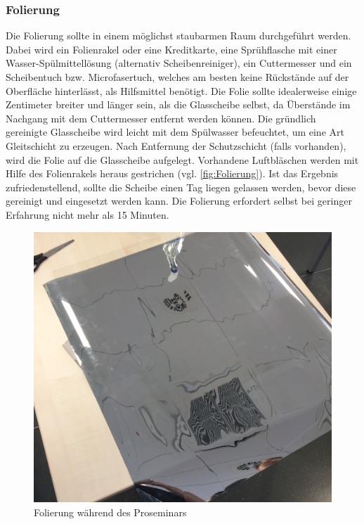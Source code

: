 \subsubsection*{Folierung}
Die Folierung sollte in einem möglichst staubarmen Raum durchgeführt werden. Dabei wird 
ein Folienrakel oder eine Kreditkarte, eine Sprühflasche mit einer Wasser-Spülmittellösung (alternativ Scheibenreiniger), ein Cuttermesser und ein Scheibentuch bzw. Microfasertuch, welches am besten keine Rückstände auf der Oberfläche hinterlässt, als Hilfsmittel benötigt.
Die Folie sollte idealerweise einige Zentimeter breiter und länger sein, als die Glasscheibe selbst, da Überstände im Nachgang mit dem Cuttermesser entfernt werden können. Die gründlich gereinigte Glasscheibe wird leicht mit dem Spülwasser befeuchtet, um eine Art Gleitschicht zu erzeugen. Nach Entfernung der Schutzschicht (falls vorhanden), wird die Folie auf die Glasscheibe aufgelegt. Vorhandene Luftbläschen werden mit Hilfe des Folienrakels heraus gestrichen (vgl. \autoref{fig:Folierung}). Ist das Ergebnis zufriedenstellend, sollte die Scheibe einen Tag liegen gelassen werden, bevor diese gereinigt und eingesetzt werden kann. Die Folierung erfordert selbst bei geringer Erfahrung nicht mehr als 15 Minuten. 

\begin{figure}
		\includegraphics[scale=0.05]{bilder/spionspiegel.jpg}
		\caption{Folierung während des Proseminars}
		\label{fig:Folierung}
\end{figure}

